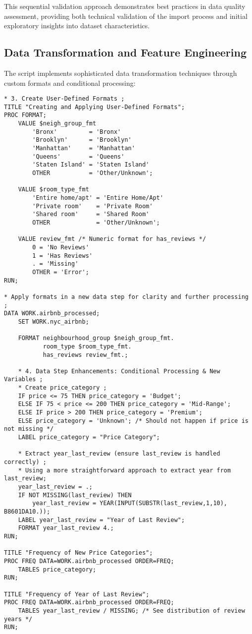 \documentclass{article}
\begin{document}
This sequential validation approach demonstrates best practices in data quality assessment, providing both technical validation of the import process and initial exploratory insights into dataset characteristics.

\subsection{Data Transformation and Feature Engineering}
The script implements sophisticated data transformation techniques through custom formats and conditional processing:

\begin{lstlisting}[style=SASStyle, caption=Format Definition and Variable Creation]
* 3. Create User-Defined Formats ;
TITLE "Creating and Applying User-Defined Formats";
PROC FORMAT;
    VALUE $neigh_group_fmt
        'Bronx'         = 'Bronx'
        'Brooklyn'      = 'Brooklyn'
        'Manhattan'     = 'Manhattan'
        'Queens'        = 'Queens'
        'Staten Island' = 'Staten Island'
        OTHER           = 'Other/Unknown';

    VALUE $room_type_fmt
        'Entire home/apt' = 'Entire Home/Apt'
        'Private room'    = 'Private Room'
        'Shared room'     = 'Shared Room'
        OTHER             = 'Other/Unknown';

    VALUE review_fmt /* Numeric format for has_reviews */
        0 = 'No Reviews'
        1 = 'Has Reviews'
        . = 'Missing'
        OTHER = 'Error';
RUN;

* Apply formats in a new data step for clarity and further processing ;
DATA WORK.airbnb_processed;
    SET WORK.nyc_airbnb;

    FORMAT neighbourhood_group $neigh_group_fmt.
           room_type $room_type_fmt.
           has_reviews review_fmt.;

    * 4. Data Step Enhancements: Conditional Processing & New Variables ;
    * Create price_category ;
    IF price <= 75 THEN price_category = 'Budget';
    ELSE IF 75 < price <= 200 THEN price_category = 'Mid-Range';
    ELSE IF price > 200 THEN price_category = 'Premium';
    ELSE price_category = 'Unknown'; /* Should not happen if price is not missing */
    LABEL price_category = "Price Category";

    * Extract year_last_review (ensure last_review is handled correctly) ;
    * Using a more straightforward approach to extract year from last_review;
    year_last_review = .;
    IF NOT MISSING(last_review) THEN
        year_last_review = YEAR(INPUT(SUBSTR(last_review,1,10), B8601DA10.));
    LABEL year_last_review = "Year of Last Review";
    FORMAT year_last_review 4.;
RUN;

TITLE "Frequency of New Price Categories";
PROC FREQ DATA=WORK.airbnb_processed ORDER=FREQ;
    TABLES price_category;
RUN;

TITLE "Frequency of Year of Last Review";
PROC FREQ DATA=WORK.airbnb_processed ORDER=FREQ;
    TABLES year_last_review / MISSING; /* See distribution of review years */
RUN;
\end{lstlisting}
\end{document}
